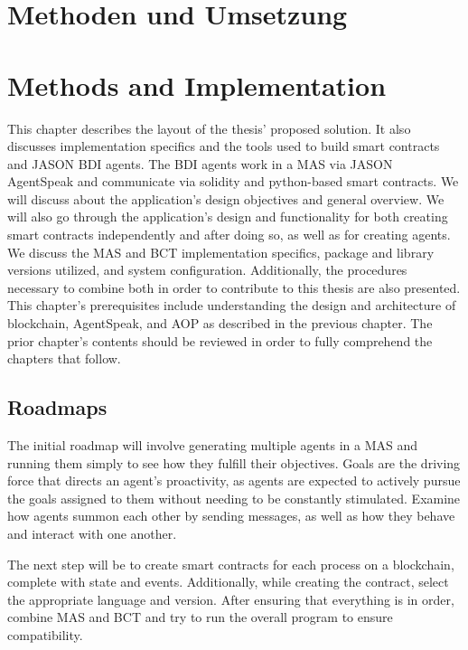 {\chapter{Methoden und Umsetzung}}
{\chapter{Methods and Implementation}}
\label{sec:methods}


This chapter describes the layout of the thesis' proposed solution. It also discusses implementation specifics and the tools used to build smart contracts and JASON \ac{BDI} agents. The \ac{BDI} agents work in a \ac{MAS} via JASON AgentSpeak and communicate via solidity and python-based smart contracts. We will discuss about the application's design objectives and general overview. We will also go through the application's design and functionality for both creating smart contracts independently and after doing so, as well as for creating agents. We discuss the \ac{MAS} and \ac{BCT} implementation specifics, package and library versions utilized, and system configuration. Additionally, the procedures necessary to combine both in order to contribute to this thesis are also presented. This chapter's prerequisites include understanding the design and architecture of blockchain, AgentSpeak, and \ac{AOP} as described in the previous chapter. The prior chapter's contents should be reviewed in order to fully comprehend the chapters that follow.

\section{Roadmaps}

The initial roadmap will involve generating multiple agents in a \ac{MAS} and running them simply to see how they fulfill their objectives. Goals are the driving force that directs an agent's proactivity, as agents are expected to actively pursue the goals assigned to them without needing to be constantly stimulated. Examine how agents summon each other by sending messages, as well as how they behave and interact with one another. 

\vspace{.5cm}

The next step will be to create smart contracts for each process on a blockchain, complete with state and events. Additionally, while creating the contract, select the appropriate language and version. After ensuring that everything is in order, combine \ac{MAS} and \ac{BCT} and try to run the overall program to ensure compatibility.

